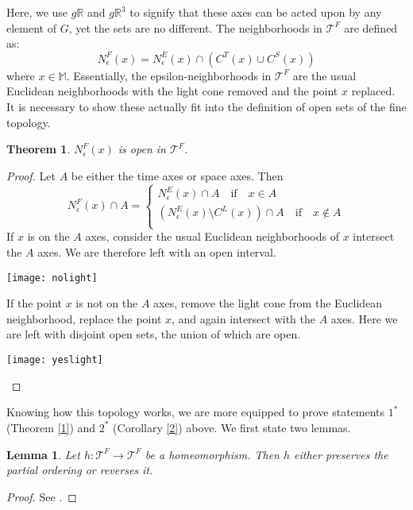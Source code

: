 \documentclass[12pt]{article}
\newtheorem{thm}{Theorem}
\newtheorem{lem}{Lemma}
\theoremstyle{defn}
\theoremstyle{pf}
\newcommand{\M}{\mathbb{M}}
\newcommand{\R}{\mathbb{R}}
\newcommand{\0}{\emptyset}
\renewcommand{\-}{\setminus}
\begin{document}
Here, we use $g\R$ and $g\R^3$ to signify that these axes can be acted upon by any element of $G$, yet the sets are no different. The neighborhoods in $\mathcal{T}^F$ are defined as: $$N_\epsilon^F(x)=N_\epsilon^E(x)\cap\left(C^T(x)\cup C^S(x)\right)$$ where $x\in\M$. Essentially, the epsilon-neighborhoods in $\mathcal{T}^F$ are the usual Euclidean neighborhoods with the light cone removed and the point $x$ replaced. It is necessary to show these actually fit into the definition of open sets of the fine topology.

\begin{thm}$N_\epsilon^F(x)$ is open in $\mathcal{T}^F$.
\end{thm}
\begin{proof}
Let $A$ be either the time axes or space axes. Then $$N_\epsilon^F(x)\cap A=\begin{cases}N_\epsilon^E(x)\cap A \quad \mbox{if} \quad x\in A\\
\left(N_\epsilon^E(x)\setminus C^L(x)\right)\cap A \quad \mbox{if} \quad x\notin A\\
\end{cases}
$$
If $x$ is on the $A$ axes, consider the usual Euclidean neighborhoods of $x$ intersect the $A$ axes. We are therefore left with an open interval.

{\small
\begin{center}\end{center}}
\begin{center}\texttt{[image: nolight]}\end{center}

If the point $x$ is not on the $A$ axes, remove the light cone from the Euclidean neighborhood, replace the point $x$, and again intersect with the $A$ axes. Here we are left with disjoint open sets, the union of which are open. 

{\small
\begin{center}\end{center}}
\begin{center}\texttt{[image: yeslight]}\end{center}

\end{proof}

Knowing how this topology works, we are more equipped to prove statements $1^*$ (Theorem \ref{1}) and $2^*$ (Corollary \ref{2}) above. We first state two lemmas.

\begin{lem}
 Let $h:\mathcal{T}^F\rightarrow \mathcal{T}^F$ be a homeomorphism. Then $h$ either preserves the partial ordering or reverses it.
\end{lem}
\begin{proof}
 See \cite{zeeman}.
\end{proof}
\end{document}

